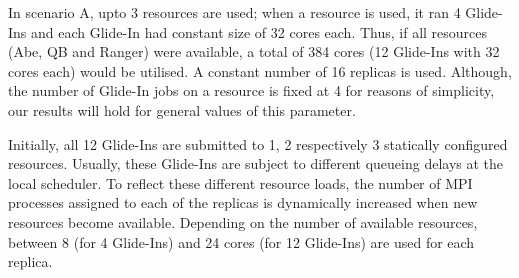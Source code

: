 \documentclass{rspublic}
\newcommand{\alnote}[1]{ {\textcolor{blue} { ***AL: #1 }}}
\newcommand{\jhanote}[1]{ {\textcolor{red} { ***SJ: #1 }}}
\newcommand{\alnote}[1]{}
\newcommand{\jhanote}[1]{}
\begin{document}

In scenario A, upto 3 resources are used; when a resource is used, it
ran 4 Glide-Ins and each Glide-In had constant size of 32 cores each.
Thus, if all resources (Abe, QB and Ranger) were available, a total of
384 cores (12 Glide-Ins with 32 cores each) would be utilised. A
constant number of 16 replicas is used. Although, the number of
Glide-In jobs on a resource is fixed at 4 for reasons of simplicity,
our results will hold for general values of this parameter.
               
Initially, all 12 Glide-Ins are submitted to 1, 2 respectively 3
statically configured resources. Usually, these Glide-Ins are subject
to different queueing delays at the local scheduler. To reflect these
different resource loads, the number of MPI processes assigned 
to each of the replicas is dynamically increased when new resources
become available. Depending on the number of available resources, 
between 8 (for 4 Glide-Ins) and 24 cores (for 12 Glide-Ins) are 
used for each replica.           
\end{document}
